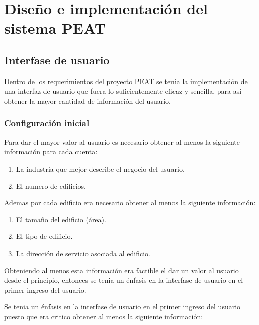 \chapter{Diseño e implementación del sistema PEAT}
\section{Interfase de usuario}
Dentro de los requerimientos del proyecto PEAT se tenia la implementación de una
interfaz de usuario que fuera lo suficientemente eficaz y sencilla, para así obtener
la mayor cantidad de información del usuario.

\subsection{Configuración inicial}
Para dar el mayor valor al usuario es necesario obtener al menos la siguiente información
para cada cuenta:

\begin{enumerate}
\item La industria que mejor describe el negocio del usuario.
\item El numero de edificios.
\end{enumerate}

Ademas por cada edificio era necesario obtener al menos la siguiente información:

\begin{enumerate}
\item El tamaño del edificio (área).
\item El tipo de edificio.
\item La dirección de servicio asociada al edificio.
\end{enumerate}

Obteniendo al menos esta información era factible el dar un valor al usuario desde el
principio, entonces se tenia un énfasis en la interfase de usuario en el primer ingreso
del usuario.

Se tenia un énfasis en la interfase de usuario en el primer ingreso del usuario puesto
que era critico obtener al menos la siguiente información:

\begin{usecase}
\end{usecase}
